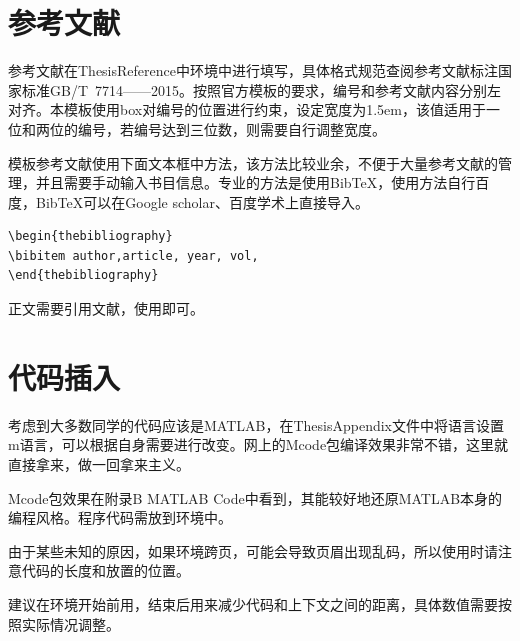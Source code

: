 {\begin{spacing}{1.5}
\section{参考文献}
参考文献在ThesisReference中环境中进行填写，具体格式规范查阅参考文献标注国家标准GB/T~7714——2015。按照官方模板的要求，编号和参考文献内容分别左对齐。本模板使用box对编号的位置进行约束，设定宽度为1.5em，该值适用于一位和两位的编号，若编号达到三位数，则需要自行调整宽度。

模板参考文献使用下面文本框中方法，该方法比较业余，不便于大量参考文献的管理，并且需要手动输入书目信息。专业的方法是使用BibTeX，使用方法自行百度，BibTeX可以在Google scholar、百度学术上直接导入。

\vspace{-4ex}
\begin{lstlisting}
\begin{thebibliography}
\bibitem author,article, year, vol,
\end{thebibliography}
\end{lstlisting}

正文需要引用文献，使用即可。

\section{代码插入}
考虑到大多数同学的代码应该是MATLAB，在ThesisAppendix文件中将语言设置m语言，可以根据自身需要进行改变。网上的Mcode包编译效果非常不错，这里就直接拿来，做一回拿来主义。

Mcode包效果在附录B MATLAB Code中看到，其能较好地还原MATLAB本身的编程风格。程序代码需放到环境中。

由于某些未知的原因，如果环境跨页，可能会导致页眉出现乱码，所以使用时请注意代码的长度和放置的位置。

建议在环境开始前用，结束后用来减少代码和上下文之间的距离，具体数值需要按照实际情况调整。

\end{spacing}
}